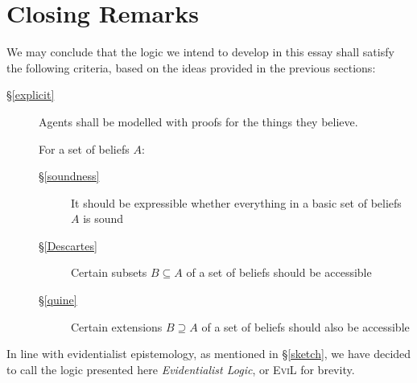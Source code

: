 \documentclass[11pt,titlepage]{report}
\numberwithin{equation}{subsection}
\renewcommand\subsection{\section}
\begin{document}
\subsection{Closing Remarks}
\label{close}
 We may conclude that the logic we intend to develop in this essay shall satisfy the
 following criteria, based on the ideas provided in the previous sections:
\begin{description}
 \item[\S\ref{explicit}]Agents shall be modelled with proofs for the things they believe.
  \item[] For a set of beliefs $A$:
\begin{description}
  \item[\S\ref{soundness}] It should be expressible whether everything
    in a basic set of beliefs $A$ is sound 
  \item[\S\ref{Descartes}] Certain subsets $B\subseteq A$ of a set of
    beliefs should be accessible
  \item[\S\ref{quine}] Certain extensions $B \supseteq A$ of a set of
    beliefs should also be accessible
\end{description}
\end{description}
In line with evidentialist epistemology, as mentioned in
\S\ref{sketch}, we have decided to call the logic presented here
\emph{Evidentialist Logic}, or \textsc{EviL} for brevity.
\end{document}
